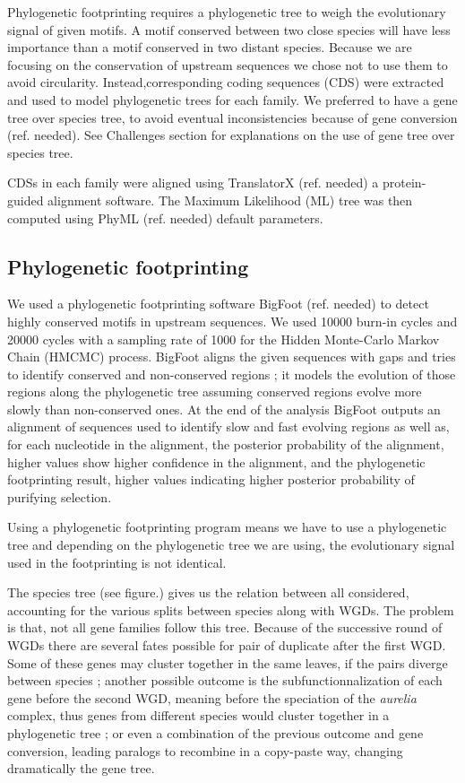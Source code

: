 Phylogenetic footprinting requires a phylogenetic tree to weigh the evolutionary signal of given motifs. A motif conserved between two close species will have less importance than a motif conserved in two distant species. Because we are focusing on the conservation of upstream sequences we chose not to use them to avoid circularity. Instead,corresponding coding sequences (CDS) were extracted and used to model phylogenetic trees for each family. We preferred to have a gene tree over species tree, to avoid eventual inconsistencies because of gene conversion (ref. needed). See Challenges section for explanations on the use of gene tree over species tree.

CDSs in each family were aligned using TranslatorX (ref. needed) a protein-guided alignment software. The Maximum Likelihood (ML) tree was then computed using PhyML (ref. needed) default parameters.

\subsection*{Phylogenetic footprinting}

We used a phylogenetic footprinting software BigFoot (ref. needed) to detect highly conserved motifs in upstream sequences. We used 10000 burn-in cycles and 20000 cycles with a sampling rate of 1000 for the Hidden Monte-Carlo Markov Chain (HMCMC) process. BigFoot aligns the given sequences with gaps and tries to identify conserved and non-conserved regions ; it models the evolution of those regions along the phylogenetic tree assuming conserved regions evolve more slowly than non-conserved ones. At the end of the analysis BigFoot outputs an alignment of sequences used to identify slow and fast evolving regions as well as, for each nucleotide in the alignment, the posterior probability of the alignment, higher values show higher confidence in the alignment, and the phylogenetic footprinting result, higher values indicating higher posterior probability of purifying selection.

Using a phylogenetic footprinting program means we have to use a phylogenetic tree and depending on the phylogenetic tree we are using, the evolutionary signal used in the footprinting is not identical.

The species tree (see figure.) gives us the relation between all considered, accounting for the various splits between species along with WGDs. The problem is that, not all gene families follow this tree. Because of the successive round of WGDs there are several fates possible for pair of duplicate after the first WGD. Some of these genes may cluster together in the same leaves, if the pairs diverge between species ; another possible outcome is the subfunctionnalization of each gene before the second WGD, meaning before the speciation of the \textit{aurelia} complex, thus genes from different species would cluster together in a phylogenetic tree ; or even a combination of the previous outcome and gene conversion, leading paralogs to recombine in a copy-paste way, changing dramatically the gene tree.

